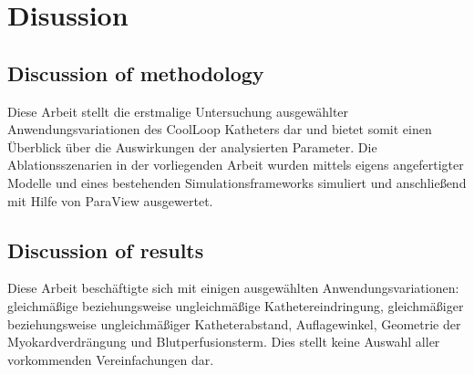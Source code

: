 \chapter{Disussion}
\label{sec:Disussion}
\section{Discussion of methodology}
\label{sec:08_MethodologyDiscussion}
Diese Arbeit stellt die erstmalige Untersuchung ausgewählter Anwendungsvariationen des CoolLoop\SymbReg{} Katheters dar und bietet somit einen Überblick über die Auswirkungen der analysierten Parameter. Die Ablationsszenarien in der vorliegenden Arbeit wurden mittels eigens angefertigter Modelle und eines bestehenden Simulationsframeworks simuliert und anschließend mit Hilfe von ParaView ausgewertet.

\newpage
\section{Discussion of results}
\label{sec:08_ResultsDiscussion}
Diese Arbeit beschäftigte sich mit einigen ausgewählten Anwendungsvariationen: gleichmäßige beziehungsweise ungleichmäßige Kathetereindringung, gleichmäßiger beziehungsweise ungleichmäßiger Katheterabstand, Auflagewinkel, Geometrie der Myokardverdrängung und Blutperfusionsterm. Dies stellt keine Auswahl aller vorkommenden Vereinfachungen dar. 
